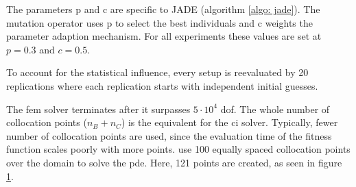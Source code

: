 \documentclass[./\jobname.tex]{subfiles}
\begin{document}
The parameters p and c are specific to JADE (algorithm \ref{algo: jade}). The mutation operator  uses p to select the best individuals and c weights the parameter adaption mechanism. For all experiments these values are set at $p=0.3$ and $c=0.5$. 

To account for the statistical influence, every setup is reevaluated by 20 replications where each replication starts with independent initial guesses. 

The \gls{fem} solver terminates after it surpasses $5 \cdot 10^4$ \gls{dof}. The whole number of collocation points ($n_B + n_C$) is the equivalent for the \gls{ci} solver. Typically, fewer number of collocation points are used, since the evaluation time of the fitness function scales poorly with more points. \cite{chaquet_using_2019} use 100 equally spaced collocation points over the domain to solve the \gls{pde}. Here, 121 points are created, as seen in figure \ref{fig:collocation_points}. 


\begin{figure}[h]
	\centering
	\noindent{}
	\label{fig:collocation_points}
\end{figure}
\end{document}
